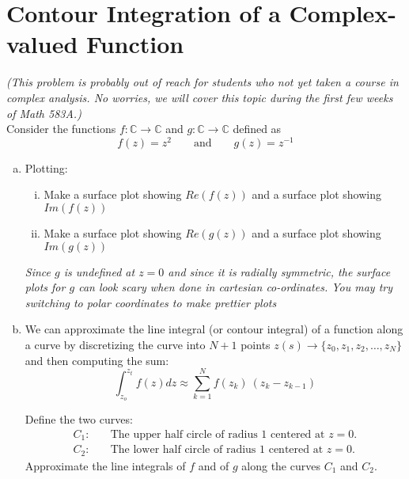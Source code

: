 \section{Contour Integration of a Complex-valued Function}
\textit{(This problem is probably out of reach for students who not yet taken a course in complex analysis. No worries, we will cover this topic during the first few weeks of Math 583A.)}\\

\noindent Consider the functions $f:\mathbb{C} \to \mathbb{C}$ and $g:\mathbb{C} \to \mathbb{C}$ defined as
\begin{equation*}
f(z) = z^2 \quad \quad \text{and} \quad \quad g(z) = z^{-1}
\end{equation*}
\begin{enumerate}[(a)]
    \item Plotting:
    \begin{enumerate}[i.] 
        \item Make a surface plot showing $Re(f(z))$ and a surface plot showing $Im(f(z))$
        \item Make a surface plot showing $Re(g(z))$ and a surface plot showing $Im(g(z))$
    \end{enumerate}
    \textit{Since $g$ is undefined at $z = 0$ and since it is radially symmetric, the surface plots for $g$ can look scary when done in cartesian co-ordinates. You may try switching to polar coordinates to make prettier plots}
    \item     We can approximate the line integral (or contour integral) of a function along a curve by discretizing the curve into $N+1$ points $z(s) \to \{z_0, z_1, z_2, \dots, z_N\}$ and then computing the sum:
    \begin{equation*}
    \int_{z_o}^{z_t} f(z) dz \approx \sum_{k = 1}^{N} f(z_k) \ (z_{k} - z_{k-1})
    \end{equation*}
    \begin{minipage}{.7\textwidth}
    Define the two curves:
    \begin{align*}
    C_1:&  \quad \text{The upper half circle of radius 1 centered at $z=0$.}\\
    C_2:&  \quad \text{The lower half circle of radius 1 centered at $z=0$.}
    \end{align*}
    Approximate the line integrals of $f$ and of $g$ along the curves $C_1$ and $C_2$.
    \end{minipage}
    \begin{minipage}{.29\textwidth}

\end{minipage}
\end{enumerate}
